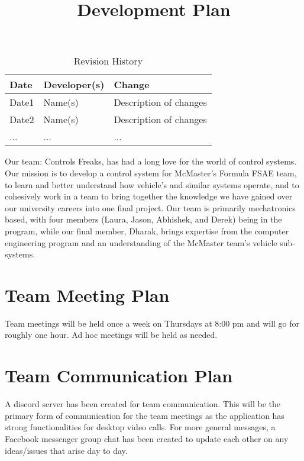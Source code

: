 \documentclass{article}
\title{Development Plan\\\progname}
\author{\authname}
\date{}
\begin{document}
\begin{table}[hp]
\caption{Revision History} \label{TblRevisionHistory}
\begin{tabularx}{\textwidth}{llX}
\toprule
\textbf{Date} & \textbf{Developer(s)} & \textbf{Change}\\
\midrule
Date1 & Name(s) & Description of changes\\
Date2 & Name(s) & Description of changes\\
... & ... & ...\\
\bottomrule
\end{tabularx}
\end{table}

\newpage

\maketitle

Our team: Controls Freaks, has had a long love for 
the world of control systems. Our mission is to develop 
a control system for McMaster’s Formula FSAE team, to learn 
and better understand how vehicle’s and similar systems operate, 
and to cohesively work in a team to bring together the knowledge 
we have gained over our university careers into one final project. 
Our team is primarily mechatronics based, with four members 
(Laura, Jason, Abhishek, and Derek) being in the program, while 
our final member, Dharak, brings expertise from the computer engineering 
program and an understanding of the McMaster team's vehicle sub-systems.

\section{Team Meeting Plan}
Team meetings will be held once a week on 
Thursdays at 8:00 pm and will go for roughly 
one hour. Ad hoc meetings will be held as needed.

\section{Team Communication Plan}

A discord server has been created for team communication. This will be 
the primary form of communication for the team meetings as the application 
has strong functionalities for desktop video calls. For more general messages, 
a Facebook messenger group chat has been created to update each other on any 
ideas/issues that arise day to day.
\\
\end{document}
